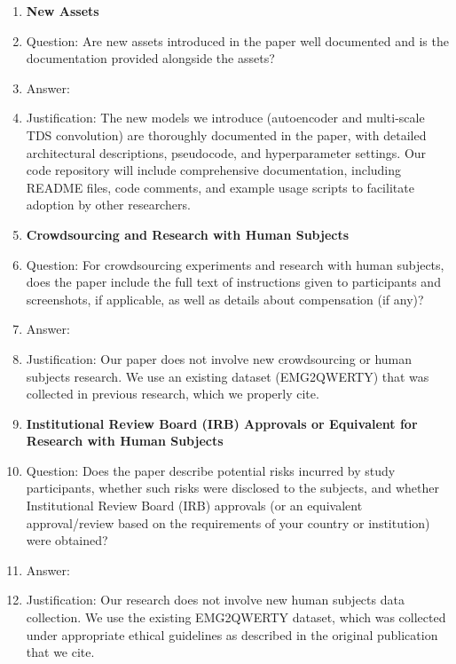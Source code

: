 \begin{enumerate}
    \item {\bf New Assets}
    \item[] Question: Are new assets introduced in the paper well documented and is the documentation provided alongside the assets?
    \item[] Answer: \answerYes{}
    \item[] Justification: The new models we introduce (autoencoder and multi-scale TDS convolution) are thoroughly documented in the paper, with detailed architectural descriptions, pseudocode, and hyperparameter settings. Our code repository will include comprehensive documentation, including README files, code comments, and example usage scripts to facilitate adoption by other researchers.

    \item {\bf Crowdsourcing and Research with Human Subjects}
    \item[] Question: For crowdsourcing experiments and research with human subjects, does the paper include the full text of instructions given to participants and screenshots, if applicable, as well as details about compensation (if any)?
    \item[] Answer: \answerNA{}
    \item[] Justification: Our paper does not involve new crowdsourcing or human subjects research. We use an existing dataset (EMG2QWERTY) that was collected in previous research, which we properly cite.

    \item {\bf Institutional Review Board (IRB) Approvals or Equivalent for Research with Human Subjects}
    \item[] Question: Does the paper describe potential risks incurred by study participants, whether such risks were disclosed to the subjects, and whether Institutional Review Board (IRB) approvals (or an equivalent approval/review based on the requirements of your country or institution) were obtained?
    \item[] Answer: \answerNA{}
    \item[] Justification: Our research does not involve new human subjects data collection. We use the existing EMG2QWERTY dataset, which was collected under appropriate ethical guidelines as described in the original publication that we cite.

\end{enumerate}